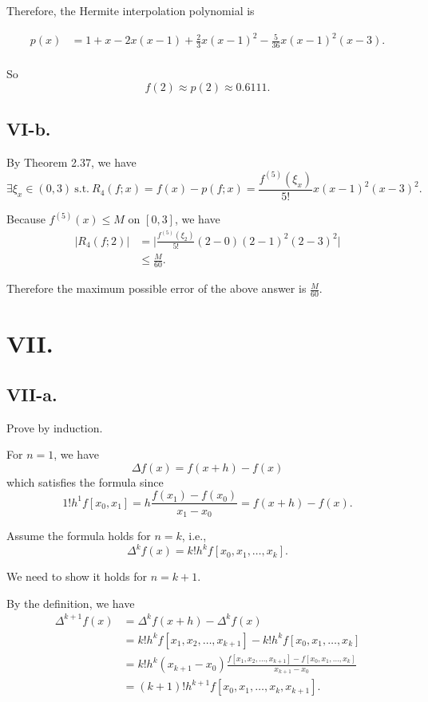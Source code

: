 \documentclass[a4paper]{article}
\begin{document}
Therefore, the Hermite interpolation polynomial is

$$
\begin{aligned}
    p(x) &= 1 + x -2x(x - 1) + \frac{2}{3}x(x-1)^2 -\frac{5}{36}x(x-1)^2(x-3).    \\
\end{aligned}
$$

So
$$
f(2) \approx p(2) \approx 0.6111.
$$

\subsection*{VI-b.}

By Theorem 2.37, we have 
$$
\exists \xi_{x} \in (0,3)\ \text{s.t.}\ R_{4}(f;x)=f(x) - p(f; x) = \frac{f^{(5)}(\xi_{x})}{5!} x(x-1)^{2}(x-3)^2.
$$

Because $f^{(5)}(x)\leq M$ on $[0,3]$, we have
$$
\begin{aligned}
  \lvert R_{4}(f;2)\rvert &= \lvert \frac{f^{(5)}(\xi_{2})}{5!} (2 - 0)(2 - 1)^2(2-3)^2 \rvert \\
  &\leq \frac{M}{60}.
\end{aligned}
$$

Therefore the maximum possible error of the above answer is $\frac{M}{60}$.

\section*{VII.}
\subsection*{VII-a.}
Prove by induction.

For $n = 1$, we have
$$
  \Delta f(x)=f(x+h)-f(x)
$$
which satisfies the formula since 
$$1!h^{1}f[x_0,x_1]=h\frac{f(x_1)-f(x_0)}{x_1-x_0}=f(x+h)-f(x).$$

Assume the formula holds for $n = k$, i.e.,
$$
  \Delta^k f(x)=k!h^{k} f[x_0,x_1,\ldots,x_k].
$$

We need to show it holds for $n = k + 1$.

By the definition, we have
$$
\begin{aligned}
  \Delta^{k+1} f(x)&=\Delta^k f(x+h)-\Delta^k f(x) \\
  &=k!h^{k} f[x_1,x_2,\ldots,x_{k+1}]-k!h^{k} f[x_0,x_1,\ldots,x_k]\\
  &=k!h^{k} (x_{k+1}-x_0)\frac{f[x_1,x_2,\ldots,x_{k+1}]-f[x_0,x_1,\ldots,x_k]}{x_{k+1}-x_0}\\
  &=(k+1)!h^{k+1}f[x_0,x_1,\ldots,x_k,x_{k+1}].
\end{aligned}
$$
\end{document}
